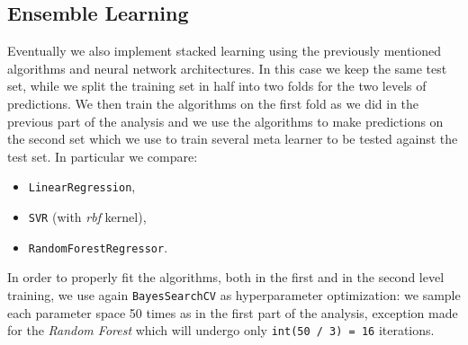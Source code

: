 \subsection{Ensemble Learning}
    Eventually we also implement stacked learning using the previously mentioned algorithms and neural network architectures. In this case we keep the same test set, while we split the training set in half into two folds for the two levels of predictions. We then train the algorithms on the first fold as we did in the previous part of the analysis and we use the algorithms to make predictions on the second set which we use to train several meta learner to be tested against the test set. In particular we compare:
    \begin{itemize}
        \item \texttt{LinearRegression},
        \item \texttt{SVR} (with \textit{rbf} kernel),
        \item \texttt{RandomForestRegressor}.
    \end{itemize}
    In order to properly fit the algorithms, both in the first and in the second level training, we use again \texttt{BayesSearchCV} as hyperparameter optimization: we sample each parameter space 50 times as in the first part of the analysis, exception made for the \textit{Random Forest} which will undergo only \texttt{int(50 / 3) = 16} iterations.